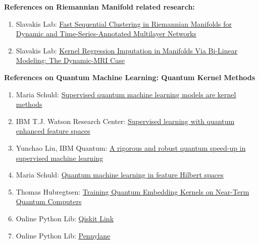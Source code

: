 \documentclass{article}
\begin{document}



%  


\textbf{References on Riemannian Manifold related research:}
\begin{enumerate}
  \item Slavakis Lab: \href{https://ieeexplore.ieee.org/document/9321498}{Fast Sequential Clustering in Riemannian Manifolds 
  for Dynamic and Time-Series-Annotated Multilayer Networks}
  \item Slavakis Lab: \href{https://ieeexplore.ieee.org/document/9699419}{Kernel Regression Imputation in Manifolds Via Bi-Linear Modeling: 
  The Dynamic-MRI Case}
\end{enumerate}

\textbf{References on Quantum Machine Learning: Quantum Kernel Methods}
\begin{enumerate}
  \item Maria Schuld: \href{https://arxiv.org/abs/2101.11020}{Supervised quantum machine learning models are kernel methods}
  \item IBM T.J. Watson Research Center: \href{https://arxiv.org/abs/1804.11326}{Supervised learning with quantum enhanced feature spaces}
  \item Yunchao Liu, IBM Quantum: \href{https://arxiv.org/abs/2010.02174}{A rigorous and robust quantum speed-up in supervised machine learning}
  \item Maria Schuld: \href{https://arxiv.org/abs/1803.07128}{Quantum machine learning in feature Hilbert spaces}
  \item Thomas Hubregtsen: \href{https://arxiv.org/abs/2105.02276}{Training Quantum Embedding Kernels on Near-Term Quantum Computers}
  \item Online Python Lib: \href{https://qiskit.org/documentation/machine-learning/tutorials/03_quantum_kernel.html
  }{Qiskit Link}
  \item Online Python Lib: \href{https://pennylane.ai/qml/demos/tutorial_kernel_based_training.html}{Pennylane}
\end{enumerate}
\end{document}
